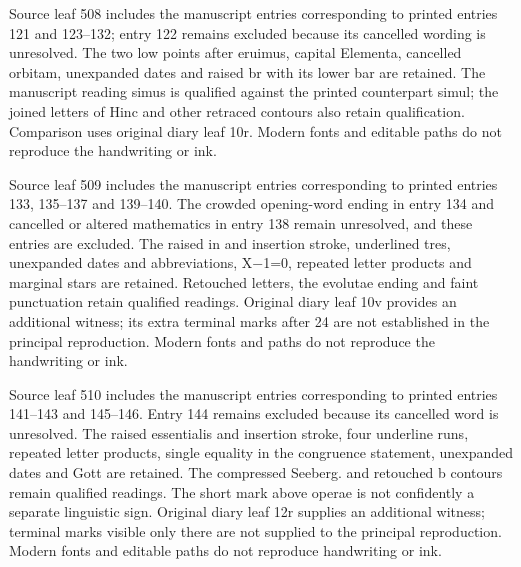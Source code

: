 Source leaf 508 includes the manuscript entries corresponding to printed entries 121 and 123–132; entry 122 remains excluded because its cancelled wording is unresolved. The two low points after eruimus, capital Elementa, cancelled orbitam, unexpanded dates and raised br with its lower bar are retained. The manuscript reading simus is qualified against the printed counterpart simul; the joined letters of Hinc and other retraced contours also retain qualification. Comparison uses original diary leaf 10r. Modern fonts and editable paths do not reproduce the handwriting or ink.

Source leaf 509 includes the manuscript entries corresponding to printed entries 133, 135–137 and 139–140. The crowded opening-word ending in entry 134 and cancelled or altered mathematics in entry 138 remain unresolved, and these entries are excluded. The raised in and insertion stroke, underlined tres, unexpanded dates and abbreviations, X−1=0, repeated letter products and marginal stars are retained. Retouched letters, the evolutae ending and faint punctuation retain qualified readings. Original diary leaf 10v provides an additional witness; its extra terminal marks after 24 are not established in the principal reproduction. Modern fonts and paths do not reproduce the handwriting or ink.

Source leaf 510 includes the manuscript entries corresponding to printed entries 141–143 and 145–146. Entry 144 remains excluded because its cancelled word is unresolved. The raised essentialis and insertion stroke, four underline runs, repeated letter products, single equality in the congruence statement, unexpanded dates and Gott are retained. The compressed Seeberg. and retouched b contours remain qualified readings. The short mark above operae is not confidently a separate linguistic sign. Original diary leaf 12r supplies an additional witness; terminal marks visible only there are not supplied to the principal reproduction. Modern fonts and editable paths do not reproduce handwriting or ink.
